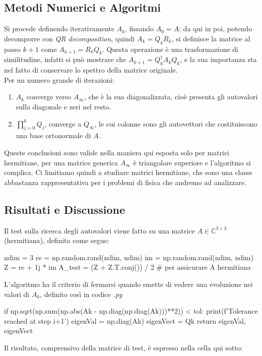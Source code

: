 \documentclass[11pt, a4paper]{article}
\begin{document}
\subsection{Metodi Numerici e Algoritmi}
Si procede definendo iterativamente $A_k$, fissando $A_0 = A$: da qui in poi, potendo decomporre con \textit{QR decomposition}, quindi $A_k = Q_kR_k$, si definisce la matrice al passo $k+1$ come $A_{k+1}=R_kQ_k$. Questa operazione è una trasformazione di similitudine, infatti si può mostrare che $A_{k+1}=Q^\dagger_k A_k Q_k$, e la sua importanza sta nel fatto di conservare lo spettro della matrice originale.\\
Per un numero grande di iterazioni:
\begin{enumerate}
    \item $A_k$ converge verso $A_\infty$, che è la sua diagonalizzata, cioè presenta gli autovalori sulla diagonale e zeri nel resto.
    \item $\prod_{j=0}^k Q_j$, converge a $Q_\infty$, le cui colonne sono gli autovettori che costituiscono una base ortonormale di $A$.
\end{enumerate}
Queste conclusioni sono valide nella maniera qui esposta solo per matrici hermitiane, per una matrice generica $A_\infty$ è triangolare superiore e l'algoritmo si complica. Ci limitiamo quindi a studiare matrici hermitiane, che sono una classe abbastanza rappresentativa per i problemi di fisica che andremo ad analizzare.

\subsection{Risultati e Discussione}
Il test sulla ricerca degli autovalori viene fatto su una matrice $A \in \mathbb{C}^{3 \times 3}$ (hermitiana), definita come segue:
\begin{elegantcode}
ndim = 3
re = np.random.rand(ndim, ndim)
im = np.random.rand(ndim, ndim)
Z = re + 1j * im
A_test = (Z + Z.T.conj()) / 2       # per assicurare A hermitiana
\end{elegantcode}
\noindent L'algoritmo ha il criterio di fermarsi quando smette di vedere una evoluzione nei valori di $A_k$, definito così in codice \textit{.py}

\begin{elegantcode}
if np.sqrt(np.sum(np.abs(Ak - np.diag(np.diag(Ak)))**2)) < tol:
    print(f'Tolerance reached at step {i+1}')
    eigenVal = np.diag(Ak)
    eigenVect = Qk
    return eigenVal, eigenVect
\end{elegantcode}
Il risultato, comprensivo della matrice di test, è espresso nella cella qui sotto:
\end{document}
